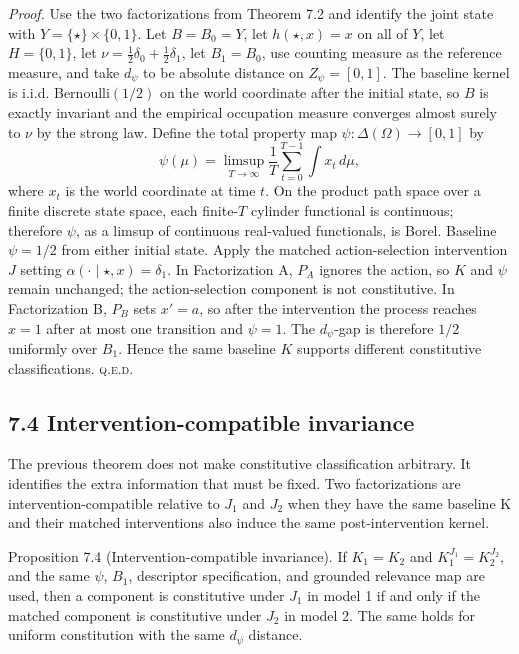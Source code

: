 \documentclass[10pt]{article}
\begin{document}
\emph{Proof.} Use the two factorizations from Theorem 7.2 and identify the joint state with $Y=\{\star\}\times\{0,1\}$. Let $B=B_0=Y$, let $h(\star,x)=x$ on all of $Y$, let $H=\{0,1\}$, let $\nu=\tfrac12\delta_0+\tfrac12\delta_1$, let $B_1=B_0$, use counting measure as the reference measure, and take $d_\psi$ to be absolute distance on $Z_\psi=[0,1]$. The baseline kernel is i.i.d. Bernoulli$(1/2)$ on the world coordinate after the initial state, so $B$ is exactly invariant and the empirical occupation measure converges almost surely to $\nu$ by the strong law. Define the total property map $\psi:\Delta(\Omega)\to[0,1]$ by
\[
\psi(\mu)=\limsup_{T\to\infty}\frac1T\sum_{t=0}^{T-1}\int x_t\,d\mu,
\]
where $x_t$ is the world coordinate at time $t$. On the product path space over a finite discrete state space, each finite-$T$ cylinder functional is continuous; therefore $\psi$, as a limsup of continuous real-valued functionals, is Borel. Baseline $\psi=1/2$ from either initial state. Apply the matched action-selection intervention $J$ setting $\alpha(\cdot\mid\star,x)=\delta_1$. In Factorization A, $P_A$ ignores the action, so $K$ and $\psi$ remain unchanged; the action-selection component is not constitutive. In Factorization B, $P_B$ sets $x'=a$, so after the intervention the process reaches $x=1$ after at most one transition and $\psi=1$. The $d_\psi$-gap is therefore $1/2$ uniformly over $B_1$. Hence the same baseline $K$ supports different constitutive classifications. \hfill\textsc{q.e.d.}

\subsection{7.4 Intervention-compatible
invariance}\label{intervention-compatible-invariance}

The previous theorem does not make constitutive classification
arbitrary. It identifies the extra information that must be fixed. Two
factorizations are intervention-compatible relative to \(J_1\) and
\(J_2\) when they have the same baseline K and their matched
interventions also induce the same post-intervention kernel.

Proposition 7.4 (Intervention-compatible invariance). If \(K_1=K_2\) and
\(K_1^{J_1}=K_2^{J_2}\), and the same \(\psi\), \(B_1\), descriptor
specification, and grounded relevance map are used, then a component is
constitutive under \(J_1\) in model 1 if and only if the matched
component is constitutive under \(J_2\) in model 2. The same holds for
uniform constitution with the same \(d_\psi\) distance.
\end{document}
